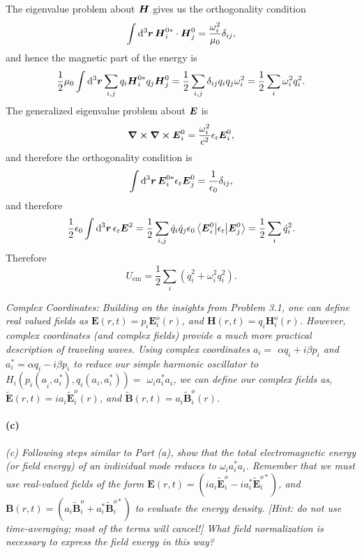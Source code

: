 \documentclass[hyperref, a4paper]{article}
\newcommand{\epsr}{\epsilon_{\text{r}}}
\begin{document}
The eigenvalue problem about $\vb*{H}$ gives us the orthogonality condition
\begin{equation}
    \int \dd[3]{\vb*{r}} \vb*{H}_i^{0*} \cdot \vb*{H}_j^0 = \frac{\omega_i^2}{\mu_0} \delta_{ij}, 
\end{equation}
and hence the magnetic part of the energy is 
\begin{equation}
    \frac{1}{2} \mu_0 \int \dd[3]{\vb*{r}} \sum_{i, j} q_i \vb*{H}_i^{0*} q_j \vb*{H}_j^0 
    = \frac{1}{2} \sum_{i, j} \delta_{ij} q_i q_j \omega_i^2 = \frac{1}{2} \sum_i \omega_i^2 q_i^2.
\end{equation}
The generalized eigenvalue problem about $\vb*{E}$ is 
\begin{equation}
    \curl{\curl{\vb*{E}_i^0}} = \frac{\omega_i^2}{c^2} \epsr \vb*{E}_i^0, 
\end{equation}
and therefore the orthogonality condition is 
\begin{equation}
    \int \dd[3]{\vb*{r}} \vb*{E}_i^{0*} \epsr \vb*{E}_j^0 = \frac{1}{\epsilon_0} \delta_{ij}, 
\end{equation}
and therefore 
\begin{equation}
    \frac{1}{2} \epsilon_0 \int \dd[3]{\vb*{r}} \epsr \vb*{E}^2 = 
    \frac{1}{2} \sum_{i,j} \dot{q}_i \dot{q}_j \epsilon_0 \mel**{\vb*{E}_i^0}{\epsr}{\vb*{E}_j^0}
    = \frac{1}{2} \sum_i \dot{q}_i^2.
\end{equation}
Therefore 
\begin{equation}
    U_{\text{em}} = \frac{1}{2} \sum_i (\dot{q}_i^2 + \omega_i^2 q_i^2).
\end{equation}

\textit{Complex Coordinates: Building on the insights from Problem 3.1, one can define real valued fields as $\mathbf{E}(r, t)=p_i \mathbf{E}_i^o(r)$, and $\mathbf{H}(r, t)=q_i \mathbf{H}_i^o(r)$. However, complex coordinates (and complex fields) provide a much more practical description of traveling waves. Using complex coordinates $a_i=$ $\alpha q_i+i \beta p_i$ and $a_i^*=\alpha q_i-i \beta p_i$ to reduce our simple harmonic oscillator to $H_i\left(p_i\left(a_{\tilde{i}}, a_i^*\right), q_i\left(a_i, a_i^*\right)\right)=$ $\omega_i a_i^* a_i$, we can define our complex fields as, $\tilde{\mathbf{E}}(r, t)=i a_i \tilde{\mathbf{E}}_i^o(r)$, and $\tilde{\mathbf{B}}(r, t)=a_i \tilde{\mathbf{B}}_i^o(r)$.}

\paragraph*{(c)} \textit{
    (c) Following steps similar to Part (a), show that the total electromagnetic energy (or field energy) of an individual mode reduces to $\omega_i a_i^* a_i$. Remember that we must use real-valued fields of the form $\mathbf{E}(r, t)=\left(i a_i \tilde{\mathbf{E}}_i^o-i a_i^* \tilde{\mathbf{E}}_i^{o *}\right)$, and $\mathbf{B}(r, t)=\left(a_i \tilde{\mathbf{B}}_i^o+a_i^* \tilde{\mathbf{B}}_i^{o *}\right)$ to evaluate the energy density. [Hint: do not use time-averaging; most of the terms will cancel!] What field normalization is necessary to express the field energy in this way?
}
\end{document}
